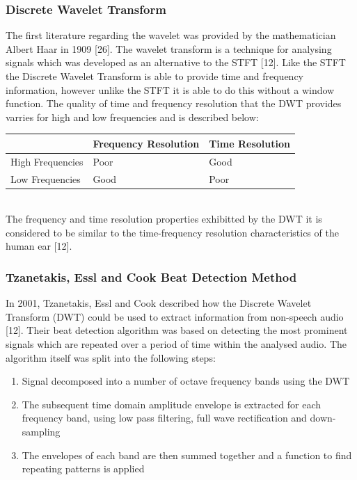 \documentclass[a4paper, 11pt]{article}
\begin{document}
\subsubsection{Discrete Wavelet Transform}
The first literature regarding the wavelet was provided by the mathematician Albert Haar in 1909 [26]. The wavelet transform is a technique for analysing signals which was developed as an alternative to the STFT [12]. Like the STFT the Discrete Wavelet Transform is able to provide time and frequency information, however unlike the STFT it is able to do this without a window function. The quality of time and frequency resolution that the DWT provides varries for high and low frequencies and is described below:
\\


\begin{tabular}{|p{4cm}|p{5cm}|p{5cm}|}
\hline
\textbf{ } & \textbf{Frequency Resolution} & \textbf{Time Resolution}\\ [0.5ex]
\hline
High Frequencies & Poor & Good\\
\hline
Low Frequencies & Good & Poor\\
\hline
\end{tabular}
\\


The frequency and time resolution properties exhibitted by the DWT it is considered to be similar to the time-frequency resolution characteristics of the human ear [12].

\subsubsection{Tzanetakis, Essl and Cook Beat Detection Method}
In 2001, Tzanetakis, Essl and Cook described how the Discrete Wavelet Transform (DWT) could be used to extract information from non-speech audio [12]. Their beat detection algorithm was based on detecting the most prominent signals which are repeated over a period of time within the analysed audio. The algorithm itself was split into the following steps: 

\begin{enumerate}
\item Signal decomposed into a number of octave frequency bands using the DWT
\item The subsequent time domain amplitude envelope is extracted for each frequency band, using low pass filtering, full wave rectification and down-sampling
\item The envelopes of each band are then summed together and a function to find repeating patterns is applied
\end{enumerate}
\end{document}
